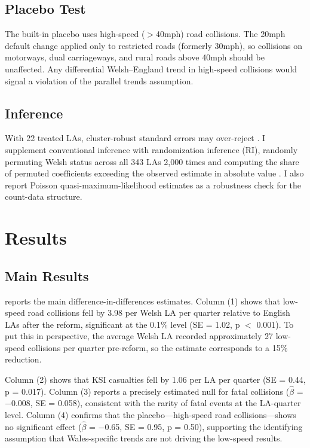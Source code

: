 \documentclass[12pt]{article}
\begin{document}
\subsection{Placebo Test}

The built-in placebo uses high-speed ($>$40mph) road collisions. The 20mph default change applied only to restricted roads (formerly 30mph), so collisions on motorways, dual carriageways, and rural roads above 40mph should be unaffected. Any differential Welsh--England trend in high-speed collisions would signal a violation of the parallel trends assumption.

\subsection{Inference}

With 22 treated LAs, cluster-robust standard errors may over-reject \citep{cameron2008bootstrap}. I supplement conventional inference with randomization inference (RI), randomly permuting Welsh status across all 343 LAs 2,000 times and computing the share of permuted coefficients exceeding the observed estimate in absolute value \citep{fisher1935design}. I also report Poisson quasi-maximum-likelihood estimates as a robustness check for the count-data structure.

\section{Results}

\subsection{Main Results}



 reports the main difference-in-differences estimates. Column (1) shows that low-speed road collisions fell by 3.98 per Welsh LA per quarter relative to English LAs after the reform, significant at the 0.1\% level (SE = 1.02, p $<$ 0.001). To put this in perspective, the average Welsh LA recorded approximately 27 low-speed collisions per quarter pre-reform, so the estimate corresponds to a 15\% reduction.

Column (2) shows that KSI casualties fell by 1.06 per LA per quarter (SE = 0.44, p = 0.017). Column (3) reports a precisely estimated null for fatal collisions ($\hat{\beta}$ = $-$0.008, SE = 0.058), consistent with the rarity of fatal events at the LA-quarter level. Column (4) confirms that the placebo---high-speed road collisions---shows no significant effect ($\hat{\beta}$ = $-$0.65, SE = 0.95, p = 0.50), supporting the identifying assumption that Wales-specific trends are not driving the low-speed results.
\end{document}

